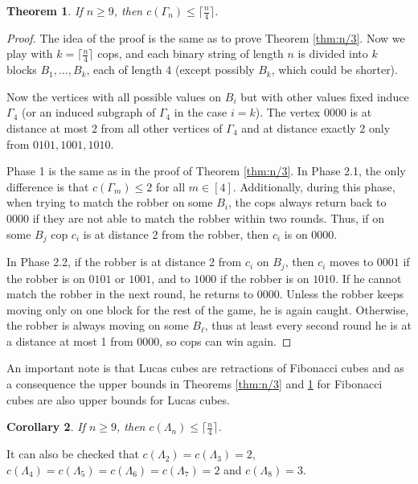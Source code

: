\documentclass[11pt]{article}
\newtheorem{theorem}{Theorem}[section]
\newtheorem{corollary}[theorem]{Corollary}
\begin{document}
\begin{theorem}
    \label{thm:n/4}
    If $n \geq 9$, then $c(\Gamma_n)\leq \lceil \frac{n}{4}\rceil$.
\end{theorem}

\begin{proof}
    The idea of the proof is the same as to prove Theorem \ref{thm:n/3}. Now we play with $k = \lceil \frac{n}{4}\rceil$ cops, and each binary string of length $n$ is divided into $k$ blocks $B_1, \ldots, B_k$, each of length 4 (except possibly $B_k$, which could be shorter). 

    Now the vertices with all possible values on $B_i$ but with other values fixed induce $\Gamma_4$ (or an induced subgraph of $\Gamma_4$ in the case $i=k$). The vertex $0000$ is at distance at most 2 from all other vertices of $\Gamma_4$ and at distance exactly 2 only from $0101, 1001, 1010$. 

    Phase 1 is the same as in the proof of Theorem \ref{thm:n/3}. In Phase 2.1, the only difference is that $c(\Gamma_m) \leq 2$ for all $m \in [4]$. Additionally, during this phase, when trying to match the robber on some $B_i$, the cops always return back to $0000$ if they are not able to match the robber within two rounds. Thus, if on some $B_j$ cop $c_i$ is at distance 2 from the robber, then $c_i$ is on $0000$.

    In Phase 2.2, if the robber is at distance 2 from $c_i$ on $B_j$, then $c_i$ moves to $0001$ if the robber is on $0101$ or $1001$, and to $1000$ if the robber is on $1010$. If he cannot match the robber in the next round, he returns to $0000$. Unless the robber keeps moving only on one block for the rest of the game, he is again caught. Otherwise, the robber is always moving on some $B_\ell$, thus at least every second round he is at a distance at most 1 from $0000$, so cops can win again.
\end{proof}

An important note is that Lucas cubes are retractions of Fibonacci cubes \cite{klavzar-2005} and as a consequence the upper bounds in Theorems \ref{thm:n/3} and \ref{thm:n/4} for Fibonacci cubes are also upper bounds for Lucas cubes. 

\begin{corollary}
    \label{cor:lucas}
    If $n \geq 9$, then $c(\Lambda_n)\leq \lceil \frac{n}{4}\rceil$.
\end{corollary}

It can also be checked that $c(\Lambda_2) = c(\Lambda_3) = 2$, $c(\Lambda_4) = c(\Lambda_5) = c(\Lambda_6) = c(\Lambda_7) = 2$ and $c(\Lambda_8) = 3$.
\end{document}
